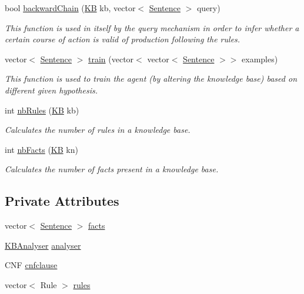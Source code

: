 \begin{DoxyCompactItemize}
bool \mbox{\hyperlink{classKB_a27a8db9fc36354f1f6eb247dfcb58adc}{backward\+Chain}} (\mbox{\hyperlink{classKB}{KB}} kb, vector$<$ \mbox{\hyperlink{classSentence}{Sentence}} $>$ query)
\begin{DoxyCompactList}\small\item\em This function is used in itself by the query mechanism in order to infer whether a certain course of action is valid of production following the rules. \end{DoxyCompactList}\item 
vector$<$ \mbox{\hyperlink{classSentence}{Sentence}} $>$ \mbox{\hyperlink{classKB_abbd192b58b489d5123d844b11e1b6355}{train}} (vector$<$ vector$<$ \mbox{\hyperlink{classSentence}{Sentence}} $>$$>$ examples)
\begin{DoxyCompactList}\small\item\em This function is used to train the agent (by altering the knowledge base) based on different given hypothesis. \end{DoxyCompactList}\item 
int \mbox{\hyperlink{classKB_acc8495060f0899308126bb8487d970a6}{nb\+Rules}} (\mbox{\hyperlink{classKB}{KB}} kb)
\begin{DoxyCompactList}\small\item\em Calculates the number of rules in a knowledge base. \end{DoxyCompactList}\item 
int \mbox{\hyperlink{classKB_abbca13393d5297fcff834849272b98a9}{nb\+Facts}} (\mbox{\hyperlink{classKB}{KB}} kn)
\begin{DoxyCompactList}\small\item\em Calculates the number of facts present in a knowledge base. \end{DoxyCompactList}\end{DoxyCompactItemize}
\subsection*{Private Attributes}
\begin{DoxyCompactItemize}
\item 
vector$<$ \mbox{\hyperlink{classSentence}{Sentence}} $>$ \mbox{\hyperlink{classKB_abf6528e5e8b106c9ec57dc6a8fb86ee7}{facts}}
\item 
\mbox{\hyperlink{classKBAnalyser}{K\+B\+Analyser}} \mbox{\hyperlink{classKB_ac8dc8b51b72a89ba4c88bbc93c40b948}{analyser}}
\item 
C\+NF \mbox{\hyperlink{classKB_a810edf2192bea36c1ec95f4610fc669b}{cnfclause}}
\item 
vector$<$ Rule $>$ \mbox{\hyperlink{classKB_a41204b166f5cf54eac4d59df9f43c07a}{rules}}
\end{DoxyCompactItemize}


